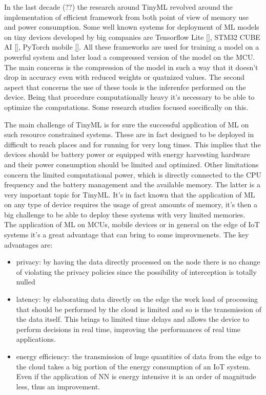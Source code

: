 \documentclass[12pt]{report}
\begin{document}
In the last decade (??) the research around TinyML revolved around the implementation of efficient framework from both point of view of memory use and power consumption. Some well known systems for deployment of ML models on tiny devices developed by big companies are Tensorflow Lite \ref{}, STM32 CUBE AI \ref{}, PyTorch mobile \ref{}. All these frameworks are used for training a model on a powerful system and later load a compressed version of the model on the MCU. The main concerns is the compression of the model in such a way that it doesn't drop in accuracy even with reduced weights or quatnized values. The second aspect that concerns the use of these tools is the inferenfce performed on the device. Being that procedure computationally heavy it's necessary to be able to optimize the computations. Some research studies focused soecifically on this.





The main challenge of TinyML is for sure the successful application of ML on such resource constrained systems. These are in fact designed to be deployed in difficult to reach places and for running for very long times. This implies that the devices should be battery power or equipped with energy harvesting hardware and their power consumption should be limited and optimized. Other limitations concern the limited computational power, which is directly connected to the CPU frequency and the battery management and the available memory. The latter is a very important topic for TinyML. It's in fact known that the application of ML on any type of device requires the usage of great amounts of memory, it's then a big challenge to be able to deploy these systems with very limited memories.\\
The application of ML on MCUs, mobile devices or in general on the edge of IoT systems it's a great advantage that can bring to some improvmenets. The key advantages are:
\begin{itemize}
\item privacy: by having the data directly processed on the node there is no change of violating the privacy policies since the possibility of interception is totally nulled
\item latency: by elaborating data directly on the edge the work load of processing that should be performed by the cloud is limited and so is the transmission of the data itself. This brings to limited time delays and allows the device to perform decisions in real time, improving the performances of real time applications.
\item energy efficiency: the transmission of huge quantities of data from the edge to the cloud takes a big portion of the energy consumption of an IoT system. Even if the application of NN is energy intensive it is an order of magnitude less, thus an improvement.
\end{itemize}
\end{document}
